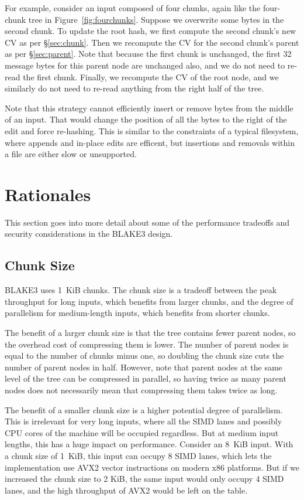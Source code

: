 \documentclass[11pt,notitlepage,a4paper]{article}
\begin{document}
For example, consider an input composed of four chunks, again like the
four-chunk tree in Figure~\ref{fig:fourchunks}. Suppose we overwrite some bytes
in the second chunk. To update the root hash, we first compute the second
chunk's new CV as per \S\ref{sec:chunk}. Then we recompute the CV for the
second chunk's parent as per \S\ref{sec:parent}. Note that because the first
chunk is unchanged, the first 32 message bytes for this parent node are
unchanged also, and we do not need to re-read the first chunk. Finally, we
recompute the CV of the root node, and we similarly do not need to re-read
anything from the right half of the tree.

Note that this strategy cannot efficiently insert or remove bytes from the
middle of an input. That would change the position of all the bytes to the
right of the edit and force re-hashing. This is similar to the constraints of a
typical filesystem, where appends and in-place edits are efficent, but
insertions and removals within a file are either slow or unsupported.

\section{Rationales}\label{sec:rationales}

This section goes into more detail about some of the performance tradeoffs and
security considerations in the BLAKE3 design.

\subsection{Chunk Size}\label{sec:chunksize}

BLAKE3 uses 1~KiB chunks. The chunk size is a tradeoff between the peak
throughput for long inputs, which benefits from larger chunks, and the degree
of parallelism for medium-length inputs, which benefits from shorter chunks.

The benefit of a larger chunk size is that the tree contains fewer parent
nodes, so the overhead cost of compressing them is lower. The number of parent
nodes is equal to the number of chunks minus one, so doubling the chunk size
cuts the number of parent nodes in half. However, note that parent nodes at the
same level of the tree can be compressed in parallel, so having twice as many
parent nodes does not necessarily mean that compressing them takes twice as
long.

The benefit of a smaller chunk size is a higher potential degree of
parallelism. This is irrelevant for very long inputs, where all the SIMD lanes
and possibly CPU cores of the machine will be occupied regardless. But at
medium input lengths, this has a huge impact on performance. Consider an 8~KiB
input. With a chunk size of 1~KiB, this input can occupy 8 SIMD lanes, which
lets the implementation use AVX2 vector instructions on modern x86 platforms.
But if we increased the chunk size to 2 KiB, the same input would only occupy 4
SIMD lanes, and the high throughput of AVX2 would be left on the table.
\end{document}
